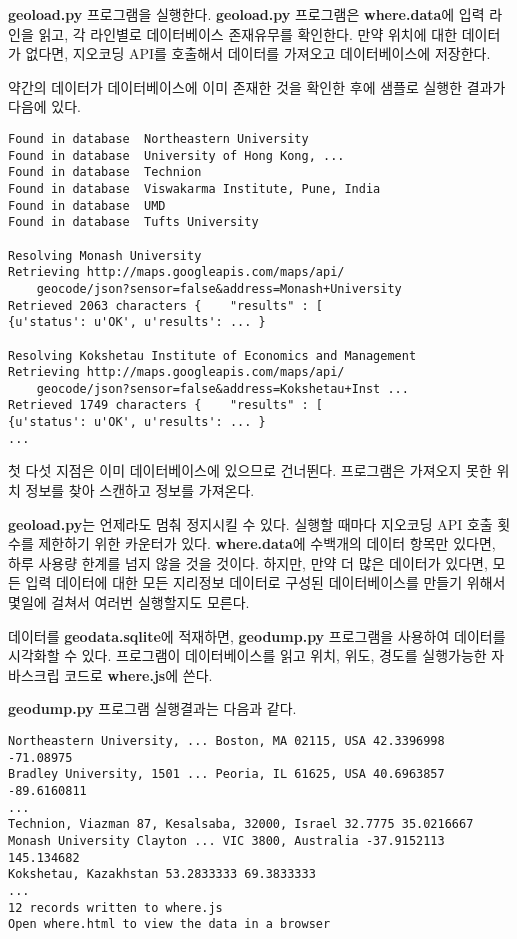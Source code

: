 {\bf geoload.py} 프로그램을 실행한다. 
{\bf geoload.py} 프로그램은 {\bf where.data}에 입력 라인을 읽고, 각 라인별로 데이터베이스 존재유무를 확인한다. 
만약 위치에 대한 데이터가 없다면, 지오코딩 API를 호출해서 데이터를 가져오고 데이터베이스에 저장한다.

약간의 데이터가 데이터베이스에 이미 존재한 것을 확인한 후에 샘플로 실행한 결과가 다음에 있다.

\beforeverb
\begin{verbatim}
Found in database  Northeastern University
Found in database  University of Hong Kong, ...
Found in database  Technion
Found in database  Viswakarma Institute, Pune, India
Found in database  UMD
Found in database  Tufts University

Resolving Monash University
Retrieving http://maps.googleapis.com/maps/api/
    geocode/json?sensor=false&address=Monash+University
Retrieved 2063 characters {    "results" : [  
{u'status': u'OK', u'results': ... }

Resolving Kokshetau Institute of Economics and Management
Retrieving http://maps.googleapis.com/maps/api/
    geocode/json?sensor=false&address=Kokshetau+Inst ...
Retrieved 1749 characters {    "results" : [  
{u'status': u'OK', u'results': ... }
...
\end{verbatim}
\afterverb
%

첫 다섯 지점은 이미 데이터베이스에 있으므로 건너뛴다. 
프로그램은 가져오지 못한 위치 정보를 찾아 스캔하고 정보를 가져온다.

{\bf geoload.py}는 언제라도 멈춰 정지시킬 수 있다. 
실행할 때마다 지오코딩 API 호출 횟수를 제한하기 위한 카운터가 있다.
{\bf where.data}에 수백개의 데이터 항목만 있다면, 하루 사용량 한계를 넘지 않을 것을 것이다. 
하지만, 만약 더 많은 데이터가 있다면, 모든 입력 데이터에 대한 모든 지리정보 데이터로 구성된 데이터베이스를 만들기 위해서 
몇일에 걸쳐서 여러번 실행할지도 모른다.

데이터를 {\bf geodata.sqlite}에 적재하면, {\bf geodump.py} 프로그램을 사용하여 데이터를 시각화할 수 있다.
프로그램이 데이터베이스를 읽고 위치, 위도, 경도를 실행가능한 자바스크립 코드로 {\bf where.js}에 쓴다.

{\bf geodump.py} 프로그램 실행결과는 다음과 같다.

\beforeverb
\begin{verbatim}
Northeastern University, ... Boston, MA 02115, USA 42.3396998 -71.08975
Bradley University, 1501 ... Peoria, IL 61625, USA 40.6963857 -89.6160811
...
Technion, Viazman 87, Kesalsaba, 32000, Israel 32.7775 35.0216667
Monash University Clayton ... VIC 3800, Australia -37.9152113 145.134682
Kokshetau, Kazakhstan 53.2833333 69.3833333
...
12 records written to where.js
Open where.html to view the data in a browser
\end{verbatim}
\afterverb
%


